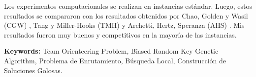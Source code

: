 \bigskip

Los experimentos computacionales se realizan en instancias estándar. Luego, estos resultados se compararon con los resultados obtenidos por Chao, Golden y Wasil (CGW) \cite{ChaoGoldenWasil}, Tang y Miller-Hooks (TMH) \cite{TangMillerHooks} y Archetti, Hertz, Speranza (AHS) \cite{ArchettiHertzSperanza}. Mis resultados fueron muy buenos y competitivos en la mayoría de las instancias.

\bigskip

\noindent\textbf{Keywords:} Team Orienteering Problem, Biased Random Key Genetic Algorithm, Problema de Enrutamiento, Búsqueda Local, Construcción de Soluciones Golosas.
